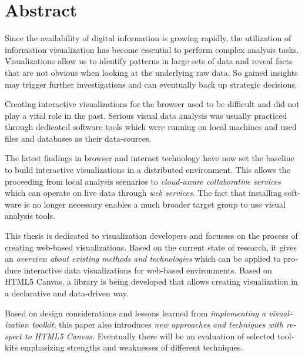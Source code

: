 \chapter{Abstract}

\begin{english} %

Since the availability of digital information is growing rapidly, the utilization of information visualization has become essential to perform complex analysis tasks. Visualizations allow us to identify patterns in large sets of data and reveal facts that are not obvious when looking at the underlying raw data. So gained insights may trigger further investigations and can eventually back up strategic decisions.

Creating interactive visualizations for the browser used to be difficult and did not play a vital role in the past. Serious visual data analysis was usually practiced through dedicated software tools which were running on local machines and used files and databases as their data-sources. 

The latest findings in browser and internet technology have now set the baseline to build interactive visualizations in a distributed environment. This allows the proceeding from local analysis scenarios to \emph{cloud-aware collaborative services} which can operate on live data through \emph{web services}. The fact that installing software is no longer necessary enables a much broader target group to use visual analysis tools.

This thesis is dedicated to visualization developers and focusses on the process of creating web-based visualizations. Based on the current state of research, it gives an \emph{overview about existing methods and technologies} which can be applied to produce interactive data visualizations for web-based environments. Based on HTML5 Canvas, a library is being developed that allows creating visualization in a declarative and data-driven way.

Based on design considerations and lessons learned from \emph{implementing a visualization toolkit}, this paper also introduces \emph{new approaches and techniques with respect to HTML5 Canvas}. Eventually there will be an evaluation of selected toolkits emphasizing strengths and weaknesses of different techniques.

\end{english}
